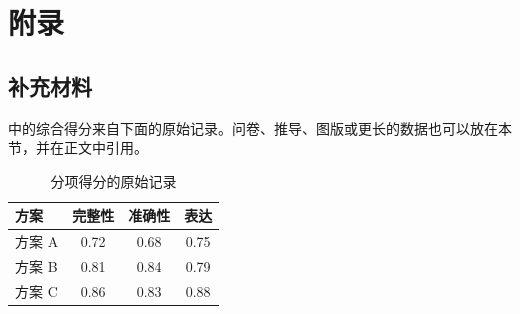 \appendix
\section{附录}
\label{sec:appendix}

\subsection{补充材料}
中的综合得分来自下面的原始记录。问卷、推导、图版或更长的数据也可以放在本节，并在正文中引用。

\begin{table}[htbp]
  \centering
  \caption{分项得分的原始记录}
  \label{tab:raw}
  \begin{tabular}{lccc}
    \toprule
    方案 & 完整性 & 准确性 & 表达 \\
    \midrule
    方案 A & 0.72 & 0.68 & 0.75 \\
    方案 B & 0.81 & 0.84 & 0.79 \\
    方案 C & 0.86 & 0.83 & 0.88 \\
    \bottomrule
  \end{tabular}
\end{table}
